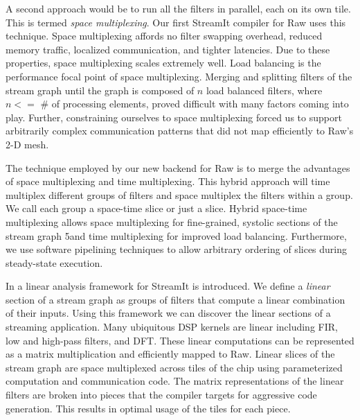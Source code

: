 \documentclass{csailabstractbook}
\begin{document}
A second approach would be to run all the filters in parallel, each on
its own tile.  This is termed {\it space multiplexing}.  Our first 
StreamIt compiler for Raw uses this technique.  Space multiplexing
affords no filter swapping overhead, reduced memory traffic,
localized communication, and tighter latencies.  Due to these
properties, space multiplexing scales extremely well.  
Load balancing is the performance focal point of space multiplexing.  Merging
and splitting filters of the stream graph until the graph is composed
of $n$ load balanced filters, where $n <=$ \# of processing
elements, proved difficult with many factors coming into play.
Further, constraining ourselves to space multiplexing forced us to
support arbitrarily complex communication patterns that did not map
efficiently to Raw's 2-D mesh.

The technique employed by our new backend for Raw is to merge the
advantages of space multiplexing and time multiplexing.  This hybrid
approach will time multiplex different groups of filters and space
multiplex the filters within a group. We call each group a space-time
slice or just a slice.  Hybrid space-time multiplexing allows space
multiplexing for fine-grained, systolic sections of the stream graph
5and time
multiplexing for improved load balancing.  Furthermore, we use
software pipelining techniques to allow arbitrary ordering of slices
during steady-state execution.

In \cite{lamb03} a linear analysis framework for StreamIt is
introduced.  We define a {\it linear} section of a stream graph as
groups of filters that compute a linear combination of their inputs.
Using this framework we can discover the linear sections of a
streaming application.  Many ubiquitous DSP kernels are linear
including FIR, low and high-pass filters, and DFT.  These linear
computations can be represented as a matrix multiplication and
efficiently mapped to Raw.  Linear slices of the stream
graph are space multiplexed across tiles of the chip using
parameterized computation and communication code.  The matrix
representations of the linear filters are broken into pieces
that the compiler targets for aggressive code generation.  This
results in optimal usage of the tiles for each piece.
\end{document}
